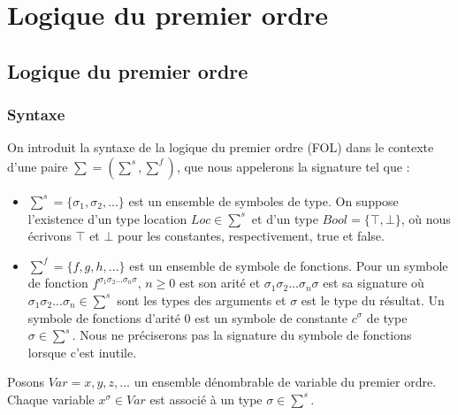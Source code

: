 \documentclass[9pt]{book}
\begin{document}
\chapter{Logique du premier ordre}
	\section{Logique du premier ordre}
		\subsection{Syntaxe}
		On introduit la syntaxe de la logique du premier ordre (FOL) dans le contexte d'une paire $\sum = (\sum^s,\sum^f)$, que nous appelerons la signature tel que :
		\begin{itemize}
		\item $\sum^s = \{ \sigma_{1}, \sigma_{2},...\}$ est un ensemble de symboles de type. On suppose l'existence d'un type location $Loc \in \sum^{s}$ et d'un type $Bool = \{ \top , \bot \}$, o\`u nous \'ecrivons $\top$ et $\bot$ pour les constantes, respectivement, true et false.
		\item $\sum^f = \{ f, g, h,...\}$ est un ensemble de symbole de fonctions. Pour un symbole de fonction $f^{\sigma_{1}\sigma_{2}... \sigma_{n}\sigma}$, $n \geq 0$ est son arit\'e et $\sigma_{1}\sigma_{2}... \sigma_{n}\sigma$ est sa signature o\`u $\sigma_{1}\sigma_{2}... \sigma_{n} \in \sum^{s}$ sont les types des arguments et $\sigma$ est le type du r\'esultat. Un symbole de fonctions d'arit\'e 0 est un symbole de constante $c^{\sigma}$ de type $\sigma \in \sum^{s}$. Nous ne pr\'eciserons pas la signature du symbole de fonctions lorsque c'est inutile.
		\end{itemize}

	   Posons $Var = {x,y,z,...}$ un ensemble d\'enombrable de variable du premier ordre. Chaque variable $x^{\sigma} \in Var$ est associ\'e \`a un type $\sigma \in \sum^{s}$.
	   
\end{document}
